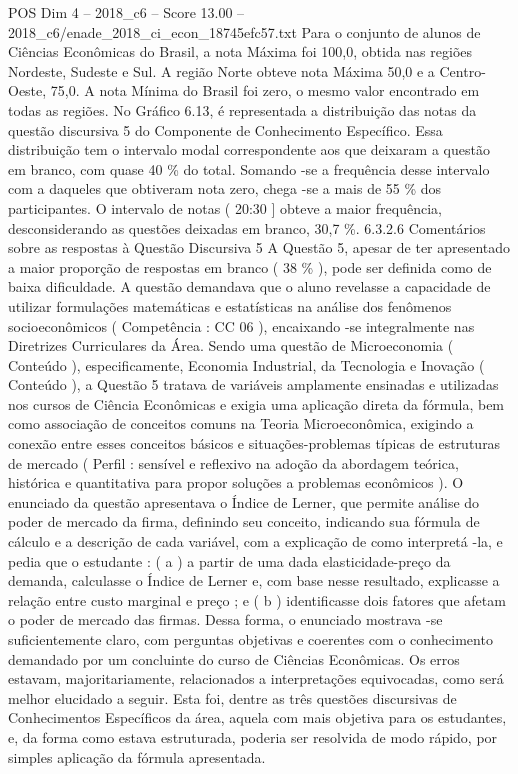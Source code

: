 \begin{textsample}{POS Dim 4 – 2018\_c6 – Score 13.00 – 2018\_c6/enade\_2018\_ci\_econ\_18745efc57.txt}
Para o conjunto de alunos de Ciências Econômicas do Brasil, a nota Máxima foi 100,0, obtida nas regiões Nordeste, Sudeste e Sul.
A região Norte obteve nota Máxima 50,0 e a Centro-Oeste, 75,0.
A nota Mínima do Brasil foi zero, o mesmo valor encontrado em todas as regiões.
No Gráfico 6.13, é representada a distribuição das notas da questão discursiva 5 do Componente de Conhecimento Específico.
Essa distribuição tem o intervalo modal correspondente aos que deixaram a questão em branco, com quase 40 \% do total.
Somando -se a frequência desse intervalo com a daqueles que obtiveram nota zero, chega -se a mais de 55 \% dos participantes.
O intervalo de notas ( 20:30 ] obteve a maior frequência, desconsiderando as questões deixadas em branco, 30,7 \%. 6.3.2.6 Comentários sobre as respostas à Questão Discursiva 5 A Questão 5, apesar de ter apresentado a maior proporção de respostas em branco ( 38 \% ), pode ser definida como de baixa dificuldade.
A questão demandava que o aluno revelasse a capacidade de utilizar formulações matemáticas e estatísticas na análise dos fenômenos socioeconômicos ( Competência : CC 06 ), encaixando -se integralmente nas Diretrizes Curriculares da Área.
Sendo uma questão de Microeconomia ( Conteúdo ), especificamente, Economia Industrial, da Tecnologia e Inovação ( Conteúdo ), a Questão 5 tratava de variáveis amplamente ensinadas e utilizadas nos cursos de Ciência Econômicas e exigia uma aplicação direta da fórmula, bem como associação de conceitos comuns na Teoria Microeconômica, exigindo a conexão entre esses conceitos básicos e situações-problemas típicas de estruturas de mercado ( Perfil : sensível e reflexivo na adoção da abordagem teórica, histórica e quantitativa para propor soluções a problemas econômicos ).
O enunciado da questão apresentava o Índice de Lerner, que permite análise do poder de mercado da firma, definindo seu conceito, indicando sua fórmula de cálculo e a descrição de cada variável, com a explicação de como interpretá -la, e pedia que o estudante : ( a ) a partir de uma dada elasticidade-preço da demanda, calculasse o Índice de Lerner e, com base nesse resultado, explicasse a relação entre custo marginal e preço ; e ( b ) identificasse dois fatores que afetam o poder de mercado das firmas.
Dessa forma, o enunciado mostrava -se suficientemente claro, com perguntas objetivas e coerentes com o conhecimento demandado por um concluinte do curso de Ciências Econômicas.
Os erros estavam, majoritariamente, relacionados a interpretações equivocadas, como será melhor elucidado a seguir.
Esta foi, dentre as três questões discursivas de Conhecimentos Específicos da área, aquela com mais objetiva para os estudantes, e, da forma como estava estruturada, poderia ser resolvida de modo rápido, por simples aplicação da fórmula apresentada.

\end{textsample}
